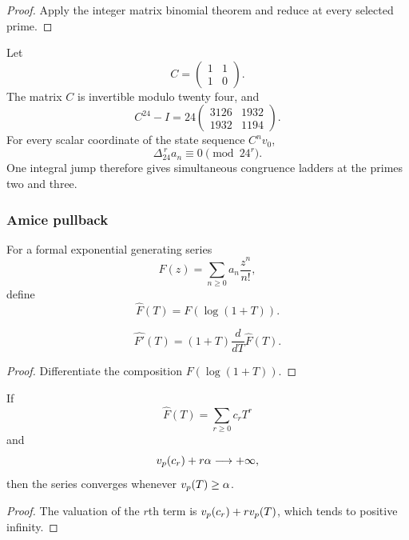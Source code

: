 \begin{proof}
Apply the integer matrix binomial theorem and reduce at every selected prime.
\end{proof}

\begin{histexample}\label{hist:ex:fibonacci_finite_adelic}
Let
\[
C=
\begin{pmatrix}
1&1\\
1&0
\end{pmatrix}.
\]
The matrix \(C\) is invertible modulo twenty four, and
\[
C^{24}-I
=
24
\begin{pmatrix}
3126&1932\\
1932&1194
\end{pmatrix}.
\]
For every scalar coordinate of the state sequence \(C^nv_0\),
\[
\boxed{
\Delta_{24}^{\,r}a_n
\equiv0
\pmod {24^r}.
}
\]
One integral jump therefore gives simultaneous congruence ladders at the primes two and three.
\end{histexample}

\subsubsection{Amice pullback}

\begin{histdefinition}\label{hist:def:amice_pullback_unified}
For a formal exponential generating series
\[
F(z)=\sum_{n\geq0}a_n\frac{z^n}{n!},
\]
define
\[
\widehat F(T)=F(\log(1+T)).
\]
\end{histdefinition}

\begin{histtheorem}\label{hist:thm:amice_derivative_unified}
\[
\boxed{
\widehat{F'}(T)
=
(1+T)\frac{d}{dT}\widehat F(T).
}
\]
\end{histtheorem}

\begin{proof}
Differentiate the composition \(F(\log(1+T))\).
\end{proof}

\begin{histproposition}\label{hist:prop:amice_weighted_convergence_unified}
If
\[
\widehat F(T)=\sum_{r\geq0}c_rT^r
\]
and
\[
v_p(c_r)+r\alpha\longrightarrow+\infty,
\]
then the series converges whenever \(v_p(T)\geq\alpha\).
\end{histproposition}

\begin{proof}
The valuation of the \(r\)th term is \(v_p(c_r)+rv_p(T)\), which tends to positive infinity.
\end{proof}

